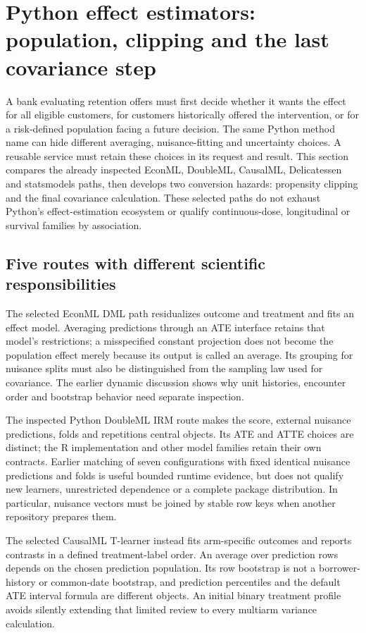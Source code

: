 \section{Python effect estimators: population, clipping and the last covariance step}
\label{exec20:pyfx-scope}
A bank evaluating retention offers must first decide whether it wants the
effect for all eligible customers, for customers historically offered the
intervention, or for a risk-defined population facing a future decision.
The same Python method name can hide different averaging, nuisance-fitting
and uncertainty choices. A reusable service must retain these choices in
its request and result. This section compares the already inspected EconML,
DoubleML, CausalML, Delicatessen and statsmodels paths, then develops two
conversion hazards: propensity clipping and the final covariance calculation.
These selected paths do not exhaust Python's effect-estimation ecosystem or
qualify continuous-dose, longitudinal or survival families by association.

\subsection{Five routes with different scientific responsibilities}
\label{exec20:pyfx-routes}
The selected EconML DML path residualizes outcome and treatment and fits an
effect model. Averaging predictions through an ATE interface retains that
model's restrictions; a misspecified constant projection does not become
the population effect merely because its output is called an average.
Its grouping for nuisance splits must also be distinguished from the
sampling law used for covariance. The earlier dynamic discussion shows why
unit histories, encounter order and bootstrap behavior need separate
inspection.~\citep{exec19_econml_source}

The inspected Python DoubleML IRM route makes the score, external nuisance
predictions, folds and repetitions central objects. Its ATE and ATTE choices
are distinct; the R implementation and other model families retain their
own contracts. Earlier matching of seven configurations with fixed identical
nuisance predictions and folds is useful bounded runtime evidence, but does
not qualify new learners, unrestricted dependence or a complete package
distribution. In particular, nuisance vectors must be joined by stable row
keys when another repository prepares them.~\citep{runtime_doubleml_scope}

The selected CausalML T-learner instead fits arm-specific outcomes and reports
contrasts in a defined treatment-label order. An average over prediction rows
depends on the chosen prediction population. Its row bootstrap is not a
borrower-history or common-date bootstrap, and prediction percentiles and
the default ATE interval formula are different objects. An initial binary
treatment profile avoids silently extending that limited review to every
multiarm variance calculation.~\citep{exec14_causalml_primary}

